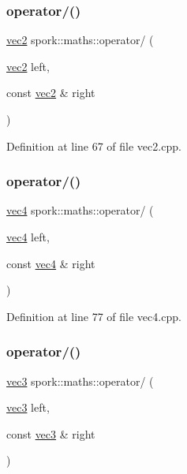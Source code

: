 \subsubsection{\texorpdfstring{operator/()}{operator/()}\hspace{0.1cm}{\footnotesize\ttfamily [1/4]}}
{\footnotesize\ttfamily \hyperlink{structspork_1_1maths_1_1vec2}{vec2} spork\+::maths\+::operator/ (\begin{DoxyParamCaption}\item[{\hyperlink{structspork_1_1maths_1_1vec2}{vec2}}]{left,  }\item[{const \hyperlink{structspork_1_1maths_1_1vec2}{vec2} \&}]{right }\end{DoxyParamCaption})}



Definition at line 67 of file vec2.\+cpp.

\mbox{\label{namespacespork_1_1maths_a803106d6ee7cd5fc7d8d3a2fb0bd423f}} 
\subsubsection{\texorpdfstring{operator/()}{operator/()}\hspace{0.1cm}{\footnotesize\ttfamily [2/4]}}
{\footnotesize\ttfamily \hyperlink{structspork_1_1maths_1_1vec4}{vec4} spork\+::maths\+::operator/ (\begin{DoxyParamCaption}\item[{\hyperlink{structspork_1_1maths_1_1vec4}{vec4}}]{left,  }\item[{const \hyperlink{structspork_1_1maths_1_1vec4}{vec4} \&}]{right }\end{DoxyParamCaption})}



Definition at line 77 of file vec4.\+cpp.

\mbox{\label{namespacespork_1_1maths_a85ae9110905b8f8a09c369de1837f234}} 
\subsubsection{\texorpdfstring{operator/()}{operator/()}\hspace{0.1cm}{\footnotesize\ttfamily [3/4]}}
{\footnotesize\ttfamily \hyperlink{structspork_1_1maths_1_1vec3}{vec3} spork\+::maths\+::operator/ (\begin{DoxyParamCaption}\item[{\hyperlink{structspork_1_1maths_1_1vec3}{vec3}}]{left,  }\item[{const \hyperlink{structspork_1_1maths_1_1vec3}{vec3} \&}]{right }\end{DoxyParamCaption})}



